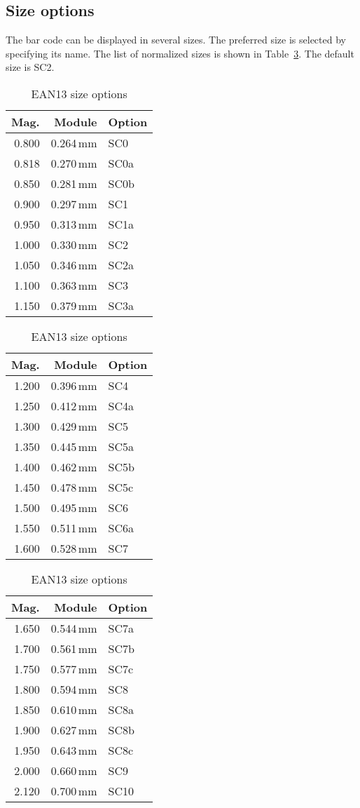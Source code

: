 \documentclass[11pt]{article}
\begin{document}
\subsection{Size options}
The bar code can be displayed in several sizes. The preferred size is selected by specifying its
name. The list of normalized sizes is shown in Table~\ref{size.options}. The default size is SC2.

\begin{table}[hbt]
\caption{EAN13 size options}\label{size.options}
\bigskip
\noindent
\begin{tabular}{|rrl|}\hline
\bfseries Mag. & \bfseries Module & \bfseries Option \\ \hline
0.800 & 0.264\,mm & SC0 \\
0.818 & 0.270\,mm & SC0a \\
0.850 & 0.281\,mm & SC0b \\
0.900 & 0.297\,mm & SC1 \\
0.950 & 0.313\,mm & SC1a \\
1.000 & 0.330\,mm & SC2 \\
1.050 & 0.346\,mm & SC2a \\
1.100 & 0.363\,mm & SC3 \\
1.150 & 0.379\,mm & SC3a \\
\hline
\end{tabular}\hfill
\begin{tabular}{|rrl|}\hline
\bfseries Mag. & \bfseries Module & \bfseries Option \\ \hline
1.200 & 0.396\,mm & SC4 \\
1.250 & 0.412\,mm & SC4a \\
1.300 & 0.429\,mm & SC5 \\
1.350 & 0.445\,mm & SC5a \\
1.400 & 0.462\,mm & SC5b \\
1.450 & 0.478\,mm & SC5c \\
1.500 & 0.495\,mm & SC6 \\
1.550 & 0.511\,mm & SC6a \\
1.600 & 0.528\,mm & SC7 \\
\hline
\end{tabular}\hfill
\begin{tabular}{|rrl|}\hline
\bfseries Mag. & \bfseries Module & \bfseries Option \\ \hline
1.650 & 0.544\,mm & SC7a \\
1.700 & 0.561\,mm & SC7b \\
1.750 & 0.577\,mm & SC7c \\
1.800 & 0.594\,mm & SC8 \\
1.850 & 0.610\,mm & SC8a \\
1.900 & 0.627\,mm & SC8b \\
1.950 & 0.643\,mm & SC8c \\
2.000 & 0.660\,mm & SC9 \\
2.120 & 0.700\,mm & SC10 \\
\hline
\end{tabular}
\end{table}
\end{document}
